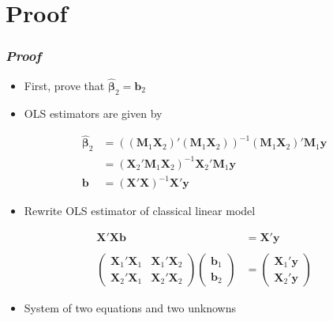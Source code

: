 \documentclass[xcolor=dvipsnames]{beamer}
\begin{document}
\section{Proof}
\begin{frame}\frametitle{\textit{Proof}}
\begin{itemize}
    \item First, prove that $\hat{\boldsymbol{\beta}}_2=\mathbf{b}_2$
    \item OLS estimators are given by
\end{itemize}
\begin{align*}
    \hat{\boldsymbol{\beta}}_2 &=
    \left(\left(\mathbf{M}_1 \mathbf{X}_2 \right)' \left(\mathbf{M}_1 \mathbf{X}_2 \right) \right)^{-1}
    \left(\mathbf{M}_1 \mathbf{X}_2 \right)' \mathbf{M}_1 \mathbf{y}\\
    &= \left(\mathbf{X}_2'\mathbf{M}_1\mathbf{X}_2\right)^{-1}\mathbf{X}_2'\mathbf{M}_1\mathbf{y}
    \nonumber \\
    \mathbf{b} &=(\mathbf{X}'\mathbf{X})^{-1}\mathbf{X}'\mathbf{y}
\end{align*}
\pause
\begin{itemize}
    \item Rewrite OLS estimator of classical linear model
\end{itemize}
\begin{align*}
    \mathbf{X}'\mathbf{X} \mathbf{b}&=\mathbf{X}'\mathbf{y}\\
    \\
    \left(\begin{matrix}\mathbf{X}_1'\mathbf{X}_1&\mathbf{X}_1'\mathbf{X}_2\\\mathbf{X}_2'\mathbf{X}_1&\mathbf{X}_2'\mathbf{X}_2\end{matrix}\right)\left(\begin{matrix}\mathbf{b}_1\\\mathbf{b}_2\end{matrix}\right)&=\left(\begin{matrix}\mathbf{X}_1'\mathbf{y}\\\mathbf{X}_2'\mathbf{y}\end{matrix}\right)
\end{align*}
\begin{itemize}
    \item System of two equations and two unknowns
\end{itemize}

\end{frame}
\end{document}

